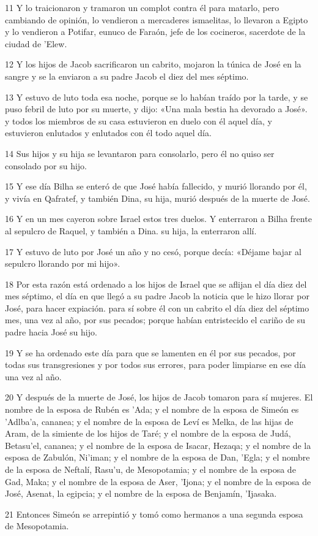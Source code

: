 \par 11 Y lo traicionaron y tramaron un complot contra él para matarlo, pero cambiando de opinión, lo vendieron a mercaderes ismaelitas, lo llevaron a Egipto y lo vendieron a Potifar, eunuco de Faraón, jefe de los cocineros, sacerdote de la ciudad de 'Elew.
\par 12 Y los hijos de Jacob sacrificaron un cabrito, mojaron la túnica de José en la sangre y se la enviaron a su padre Jacob el diez del mes séptimo.
\par 13 Y estuvo de luto toda esa noche, porque se lo habían traído por la tarde, y se puso febril de luto por su muerte, y dijo: «Una mala bestia ha devorado a José». y todos los miembros de su casa estuvieron en duelo con él aquel día, y estuvieron enlutados y enlutados con él todo aquel día.
\par 14 Sus hijos y su hija se levantaron para consolarlo, pero él no quiso ser consolado por su hijo.
\par 15 Y ese día Bilha se enteró de que José había fallecido, y murió llorando por él, y vivía en Qafratef, y también Dina, su hija, murió después de la muerte de José.
\par 16 Y en un mes cayeron sobre Israel estos tres duelos. Y enterraron a Bilha frente al sepulcro de Raquel, y también a Dina. su hija, la enterraron allí.
\par 17 Y estuvo de luto por José un año y no cesó, porque decía: «Déjame bajar al sepulcro llorando por mi hijo».
\par 18 Por esta razón está ordenado a los hijos de Israel que se aflijan el día diez del mes séptimo, el día en que llegó a su padre Jacob la noticia que le hizo llorar por José, para hacer expiación. para sí sobre él con un cabrito el día diez del séptimo mes, una vez al año, por sus pecados; porque habían entristecido el cariño de su padre hacia José su hijo.
\par 19 Y se ha ordenado este día para que se lamenten en él por sus pecados, por todas sus transgresiones y por todos sus errores, para poder limpiarse en ese día una vez al año.
\par 20 Y después de la muerte de José, los hijos de Jacob tomaron para sí mujeres. El nombre de la esposa de Rubén es 'Ada; y el nombre de la esposa de Simeón es 'Adlba'a, cananea; y el nombre de la esposa de Leví es Melka, de las hijas de Aram, de la simiente de los hijos de Taré; y el nombre de la esposa de Judá, Betasu'el, cananea; y el nombre de la esposa de Isacar, Hezaqa; y el nombre de la esposa de Zabulón, Ni'iman; y el nombre de la esposa de Dan, 'Egla; y el nombre de la esposa de Neftalí, Rasu'u, de Mesopotamia; y el nombre de la esposa de Gad, Maka; y el nombre de la esposa de Aser, 'Ijona; y el nombre de la esposa de José, Asenat, la egipcia; y el nombre de la esposa de Benjamín, 'Ijasaka.
\par 21 Entonces Simeón se arrepintió y tomó como hermanos a una segunda esposa de Mesopotamia.

